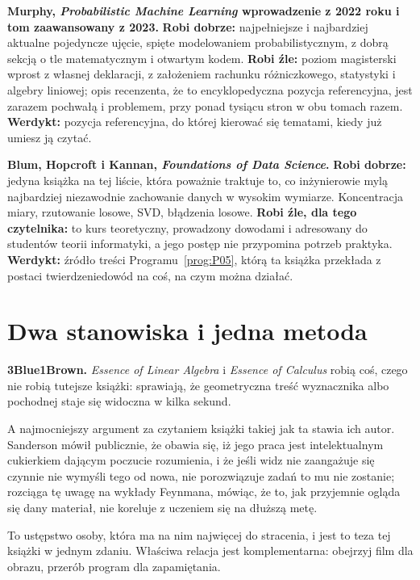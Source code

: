 \medskip
\textbf{Murphy, \emph{Probabilistic Machine Learning} \dash{} wprowadzenie
z 2022 roku i tom zaawansowany z 2023.}
\textbf{Robi dobrze:} najpełniejsze i najbardziej aktualne pojedyncze ujęcie,
spięte modelowaniem probabilistycznym, z dobrą sekcją o tle matematycznym i
otwartym kodem. \textbf{Robi źle:} poziom magisterski wprost z własnej
deklaracji, z założeniem rachunku różniczkowego, statystyki i algebry liniowej;
opis recenzenta, że to encyklopedyczna pozycja referencyjna, jest zarazem
pochwałą i problemem, przy ponad tysiącu stron w obu tomach razem.
\textbf{Werdykt:} pozycja referencyjna, do której kierować się tematami, kiedy
już umiesz ją czytać.

\medskip
\textbf{Blum, Hopcroft i Kannan, \emph{Foundations of Data Science}.}
\textbf{Robi dobrze:} jedyna książka na tej liście, która poważnie traktuje to,
co inżynierowie mylą najbardziej niezawodnie \dash{} zachowanie danych w
wysokim wymiarze. Koncentracja miary, rzutowanie losowe, SVD, błądzenia losowe.
\textbf{Robi źle, dla tego czytelnika:} to kurs teoretyczny, prowadzony
dowodami i adresowany do studentów teorii informatyki, a jego postęp nie
przypomina potrzeb praktyka.
\textbf{Werdykt:} źródło treści Programu~\ref{prog:P05}, którą ta książka
przekłada z postaci twierdzenie\dash{}dowód na coś, na czym można działać.

\section{Dwa stanowiska i jedna metoda}
\label{sec:E-positions}

\medskip
\textbf{3Blue1Brown.} \emph{Essence of Linear Algebra} i \emph{Essence of
Calculus} robią coś, czego nie robią tutejsze książki: sprawiają, że
geometryczna treść wyznacznika albo pochodnej staje się widoczna w kilka
sekund.

A najmocniejszy argument za czytaniem książki takiej jak ta stawia ich autor.
Sanderson mówił publicznie, że obawia się, iż jego praca jest intelektualnym
cukierkiem dającym poczucie rozumienia, i że jeśli widz nie zaangażuje się
czynnie \dash{} nie wymyśli tego od nowa, nie porozwiązuje zadań \dash{} to mu
nie zostanie; rozciąga tę uwagę na wykłady Feynmana, mówiąc, że to, jak
przyjemnie ogląda się dany materiał, nie koreluje z uczeniem się na dłuższą
metę.

To ustępstwo osoby, która ma na nim najwięcej do stracenia, i jest to teza tej
książki w jednym zdaniu. Właściwa relacja jest komplementarna: obejrzyj film dla
obrazu, przerób program dla zapamiętania.

